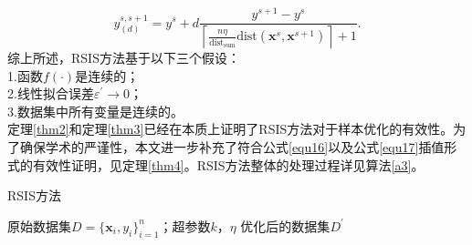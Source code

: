\documentclass{NauThesis}
\begin{document}
\begin{equation}\label{equ17}
    y^{s,s+1}_{(d)}=y^s+d\dfrac{y^{s+1}-y^{s}}{\left\lceil \frac{n\eta}{\text{dist}_{\text{sum}}}\text{dist}(\boldsymbol{x}^s,\boldsymbol{x}^{s+1})\right\rceil+1}.    
\end{equation}
综上所述，RSIS方法基于以下三个假设：
\\\hspace*{2em}1.函数$f(\cdot)$是连续的；
\\\hspace*{2em}2.线性拟合误差$\varepsilon^\prime\rightarrow0$；
\\\hspace*{2em}3.数据集中所有变量是连续的。
\\\hspace*{2em}定理\ref{thm2}和定理\ref{thm3}已经在本质上证明了RSIS方法对于样本优化的有效性。为了确保学术的严谨性，本文进一步补充了符合公式\eqref{equ16}以及公式\eqref{equ17}插值形式的有效性证明，见定理\ref{thm4}。RSIS方法整体的处理过程详见算法\ref{a3}。

\begin{algorithm}[!h]
    \caption{RSIS方法}
    \label{a3}
    \renewcommand{\algorithmicrequire}{\textbf{Input:}}
    \renewcommand{\algorithmicensure}{\textbf{Output:}}
    \begin{algorithmic}[1]
        \REQUIRE 原始数据集$D=\{\boldsymbol{x}_i,y_i \}_{i=1}^n$；超参数$k$，$\eta$
        \ENSURE 优化后的数据集$D^\prime$
        \ENDFOR
    \end{algorithmic}
\end{algorithm}
\end{document}
